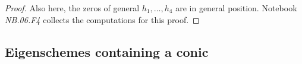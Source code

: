 \documentclass[a4paper, 11pt, reqno]{amsart}
\theoremstyle{plain}
\theoremstyle{definition}
\newcommand{\nb}[2]{\textsl{{NB}.{#1}.{#2}}}
\newcommand{\iii}{\textit{i}\,}
\begin{document}
\begin{proof}
Also here, the zeros of general $h_1, \dotsc, h_4$ are in general position.
Notebook \nb{06}{F4} collects the computations for this proof.
\end{proof}

\subsection{Eigenschemes containing a conic}
\end{document}
